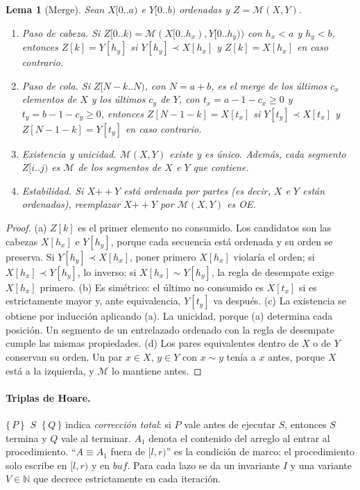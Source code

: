 \documentclass[10pt,a4paper]{article}
\theoremstyle{plain}
\newtheorem{lema}[teorema]{Lema}
\theoremstyle{definition}
\theoremstyle{remark}
\newcommand{\lt}{\prec}
\newcommand{\eqv}{\sim}
\newcommand{\cat}{\mathbin{+\!\!+}}
\newcommand{\buf}{\mathit{buf}}
\newcommand{\Mrg}{\mathcal{M}}
\newcommand{\hoare}[3]{\{\,#1\,\}\;\;#2\;\;\{\,#3\,\}}
\begin{document}
\begin{lema}[Merge]\label{lem:merge}
Sean $X[0..a)$ e $Y[0..b)$ ordenadas y $Z=\Mrg(X,Y)$.
\begin{enumerate}[label=(\alph*),nosep]
\item \emph{Paso de cabeza.} Si $Z[0..k)=\Mrg(X[0..h_x),Y[0..h_y))$ con $h_x<a$ y
  $h_y<b$, entonces $Z[k]=Y[h_y]$ si $Y[h_y]\lt X[h_x]$ y $Z[k]=X[h_x]$ en caso
  contrario.
\item \emph{Paso de cola.} Si $Z[N-k..N)$, con $N=a+b$, es el merge de los últimos
  $c_x$ elementos de $X$ y los últimos $c_y$ de $Y$, con $t_x=a-1-c_x\ge 0$ y
  $t_y=b-1-c_y\ge 0$, entonces $Z[N-1-k]=X[t_x]$ si $Y[t_y]\lt X[t_x]$ y
  $Z[N-1-k]=Y[t_y]$ en caso contrario.
\item \emph{Existencia y unicidad.} $\Mrg(X,Y)$ existe y es único. Además, cada
  segmento $Z[i..j)$ es $\Mrg$ de los segmentos de $X$ e $Y$ que contiene.
\item \emph{Estabilidad.} Si $X\cat Y$ está ordenada por partes (es decir, $X$ e $Y$
  están ordenadas), reemplazar $X\cat Y$ por $\Mrg(X,Y)$ es OE.
\end{enumerate}
\end{lema}
\begin{proof}
(a) $Z[k]$ es el primer elemento no consumido. Los candidatos son las cabezas $X[h_x]$
e $Y[h_y]$, porque cada secuencia está ordenada y su orden se preserva. Si
$Y[h_y]\lt X[h_x]$, poner primero $X[h_x]$ violaría el orden; si $X[h_x]\lt Y[h_y]$,
lo inverso; si $X[h_x]\eqv Y[h_y]$, la regla de desempate exige $X[h_x]$ primero.
(b) Es simétrico: el último no consumido es $X[t_x]$ si es estrictamente mayor y, ante
equivalencia, $Y[t_y]$ va después.
(c) La existencia se obtiene por inducción aplicando (a). La unicidad, porque (a)
determina cada posición. Un segmento de un entrelazado ordenado con la regla de
desempate cumple las mismas propiedades.
(d) Los pares equivalentes dentro de $X$ o de $Y$ conservan su orden. Un par $x\in X$,
$y\in Y$ con $x\eqv y$ tenía a $x$ antes, porque $X$ está a la izquierda, y $\Mrg$ lo
mantiene antes.
\end{proof}

\paragraph{Triplas de Hoare.} $\hoare{P}{S}{Q}$ indica \emph{corrección total}: si
$P$ vale antes de ejecutar $S$, entonces $S$ termina y $Q$ vale al terminar. $A_1$
denota el contenido del arreglo al entrar al procedimiento. ``$A\equiv A_1$ fuera de
$[l,r)$'' es la condición de marco: el procedimiento solo escribe en $[l,r)$ y en
$\buf$. Para cada lazo se da un invariante $I$ y una variante $V\in\mathbb{N}$ que
decrece estrictamente en cada iteración.
\end{document}
